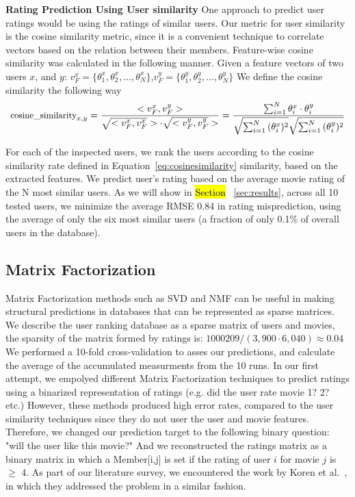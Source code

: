 \textbf{Rating Prediction Using User similarity}
One approach to predict user ratings would be using the ratings of similar users. 
Our metric for user similarity is the cosine similarity metric, since it is a convenient technique to correlate vectors based on the relation between their members.
Feature-wise cosine similarity was calculated in the following manner. Given a feature vectors of two users $x$, and $y$: $v^x_{F}=\{\theta^x_{1},\theta^x_{2},...,\theta^x_{N}\}$,$v^y_{F}=\{\theta^y_{1},\theta^y_{2},...,\theta^y_{N}\}$
We define the cosine similarity the following way
\begin{equation}
\footnotesize
\text{cosine\_similarity}_{x,y} = \frac{<v^x_{F},v^y_{F}>}{\sqrt{<v^x_{F},v^x_{F}}> \cdot \sqrt{<v^y_{F},v^y_{F}}>}=\frac{\sum^N_{i=1}{\theta^x_i \cdot \theta^y_i}}{{\sqrt{\sum^N_{i=1}{(\theta^x_i)^2} }}\sqrt{\sum^N_{i=1}{(\theta^y_i)^2 }}}
\label{eq:cosinesimilarity}
\end{equation}

For each of the inspected users, we rank the users according to the cosine similarity rate defined in Equation~\ref{eq:cosinesimilarity} similarity, based on the extracted features.
We predict user's rating based on the average movie rating of the N most similar users.
As we will show in \hl{Section} ~\ref{sec:results}, across all 10 tested users, we minimize the average RMSE 0.84 in rating misprediction, using the average of only the six most similar users (a fraction of only 0.1\% of overall users in the database).


\subsection{Matrix Factorization}

Matrix Factorization methods such as SVD and NMF can be useful in making structural predictions in databases that can be represented as sparse matrices.
We describe the user ranking database as a sparse matrix of users and movies, the sparsity of the matrix formed by ratings is: $1000209/(3,900 \cdot 6,040)\approx0.04$
We performed a 10-fold cross-validation to asses our predictions, and calculate the average of the accumulated measurments from the 10 runs. 
In our first attempt, we empolyed different Matrix Factorization techniques to predict ratings using a binarized representation of ratings (e.g. did the user rate movie 1? 2? etc.)
However, these methods produced high error rates, compared to the user similarity techniques since they do not user the user and movie features.
Therefore, we changed our prediction target to the following binary question: "will the user like this movie?"
And we reconstructed the ratings matrix as a binary matrix in which a Member[i,j] is set if the rating of user $i$ for movie $j$ is $\geq$ 4.
As part of our literature survey, we encountered the work by Koren et al.~\cite{koren2009matrix}, in which they addressed the problem in a similar fashion.

